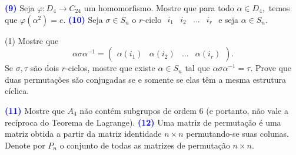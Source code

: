 \documentclass[12pt, a4paper]{article}
\newcommand{\negrito}[1]{\mbox{\boldmath{$#1$}}}
\begin{document}
\textcolor{blue}{\bf(9)}\label{72} Seja $\varphi \colon D_4 \to C_{24}$ um homomorfismo. Mostre que para todo $\alpha \in D_4,$ temos que $\varphi(\alpha^2) = e.$
\newline
\newline
\textcolor{blue}{\bf(10)}\label{73} Seja $\sigma \in S_n$ o $r$-ciclo $\begin{array}{cccc} i_1 & i_2 & \ldots & i_r \end{array}$ e seja $\alpha \in S_n.$ 
\begin{tasks}[counter-format={(tsk[a])},label-width=3.6ex, label-format = {\bfseries}, column-sep = {0pt}](1)
\task[\textcolor{Floresta}{$\negrito{(a)} $}] Mostre que
\[
\alpha \sigma \alpha^{-1} = \left(\begin{array}{cccc} \alpha(i_1) & \alpha(i_2) & \ldots & \alpha(i_r) \end{array}\right).\]
\task[\textcolor{Floresta}{$\negrito{(b)} $}] Se $\sigma, \tau$ são dois $r$-ciclos, mostre que existe $\alpha \in S_n$ tal que $\alpha \sigma \alpha^{-1} = \tau.$ 
\task[\textcolor{Floresta}{$\negrito{(c)} $}] Prove que duas permutações são conjugadas se e somente se elas têm a mesma estrutura cíclica.
\end{tasks}
\textcolor{blue}{\bf(11)}\label{74} Mostre que $A_4$ não contém subgrupos de ordem $6$ (e portanto, não vale a recíproca do Teorema de Lagrange).
\newline
\newline
\textcolor{blue}{\bf(12)}\label{75} Uma matriz de permutação é uma matriz obtida a partir da matriz identidade $n \times n$ permutando-se suas colunas. Denote por $P_n$ o conjunto de todas as matrizes de permutação $n \times n.$
\end{document}
